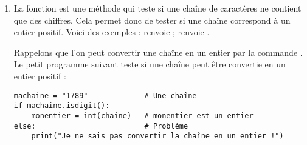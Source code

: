 \documentclass[11pt,class=report,crop=false]{standalone}
\begin{document}
\begin{cours}
\begin{enumerate}
  \item  La fonction  est une méthode \Python{} qui teste si une chaîne de caractères ne contient que des chiffres. Cela permet donc de tester si une chaîne correspond à un entier positif.
 Voici des exemples :  renvoie  ;   renvoie .
 
 Rappelons que l'on peut convertir une chaîne en un entier par la commande . Le petit programme suivant teste si une chaîne peut être convertie en un entier positif :
 
\begin{lstlisting}
machaine = "1789"             # Une chaîne
if machaine.isdigit():
    monentier = int(chaine)   # monentier est un entier
else:                         # Problème
    print("Je ne sais pas convertir la chaîne en un entier !")
\end{lstlisting} 

\end{enumerate}  
\end{cours}

\end{document}
